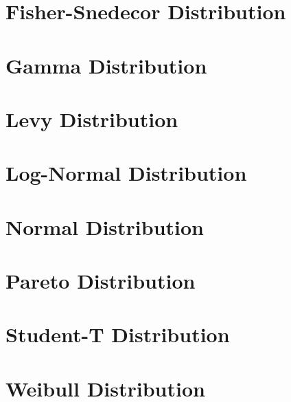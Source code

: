 	\section{Fisher-Snedecor Distribution}

	\section{Gamma Distribution}

	\section{Levy Distribution}

	\section{Log-Normal Distribution}

	\section{Normal Distribution}

	\section{Pareto Distribution}

	\section{Student-T Distribution}

	\section{Weibull Distribution}